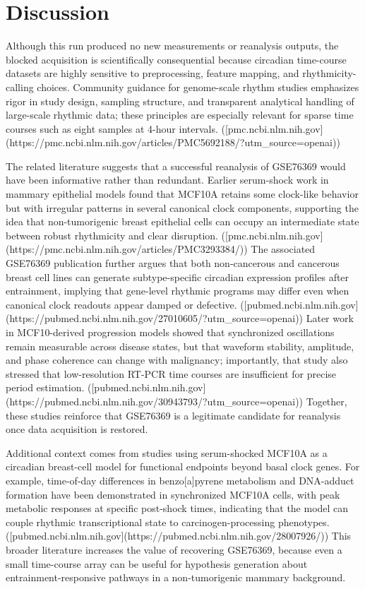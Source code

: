 \documentclass[11pt]{article}
\begin{document}
\section{Discussion}
Although this run produced no new measurements or reanalysis outputs, the blocked acquisition is scientifically consequential because circadian time-course datasets are highly sensitive to preprocessing, feature mapping, and rhythmicity-calling choices. Community guidance for genome-scale rhythm studies emphasizes rigor in study design, sampling structure, and transparent analytical handling of large-scale rhythmic data; these principles are especially relevant for sparse time courses such as eight samples at 4-hour intervals. ([pmc.ncbi.nlm.nih.gov](https://pmc.ncbi.nlm.nih.gov/articles/PMC5692188/?utm\_source=openai))

The related literature suggests that a successful reanalysis of GSE76369 would have been informative rather than redundant. Earlier serum-shock work in mammary epithelial models found that MCF10A retains some clock-like behavior but with irregular patterns in several canonical clock components, supporting the idea that non-tumorigenic breast epithelial cells can occupy an intermediate state between robust rhythmicity and clear disruption. ([pmc.ncbi.nlm.nih.gov](https://pmc.ncbi.nlm.nih.gov/articles/PMC3293384/)) The associated GSE76369 publication further argues that both non-cancerous and cancerous breast cell lines can generate subtype-specific circadian expression profiles after entrainment, implying that gene-level rhythmic programs may differ even when canonical clock readouts appear damped or defective. ([pubmed.ncbi.nlm.nih.gov](https://pubmed.ncbi.nlm.nih.gov/27010605/?utm\_source=openai)) Later work in MCF10-derived progression models showed that synchronized oscillations remain measurable across disease states, but that waveform stability, amplitude, and phase coherence can change with malignancy; importantly, that study also stressed that low-resolution RT-PCR time courses are insufficient for precise period estimation. ([pubmed.ncbi.nlm.nih.gov](https://pubmed.ncbi.nlm.nih.gov/30943793/?utm\_source=openai)) Together, these studies reinforce that GSE76369 is a legitimate candidate for reanalysis once data acquisition is restored.

Additional context comes from studies using serum-shocked MCF10A as a circadian breast-cell model for functional endpoints beyond basal clock genes. For example, time-of-day differences in benzo[a]pyrene metabolism and DNA-adduct formation have been demonstrated in synchronized MCF10A cells, with peak metabolic responses at specific post-shock times, indicating that the model can couple rhythmic transcriptional state to carcinogen-processing phenotypes. ([pubmed.ncbi.nlm.nih.gov](https://pubmed.ncbi.nlm.nih.gov/28007926/)) This broader literature increases the value of recovering GSE76369, because even a small time-course array can be useful for hypothesis generation about entrainment-responsive pathways in a non-tumorigenic mammary background.
\end{document}
